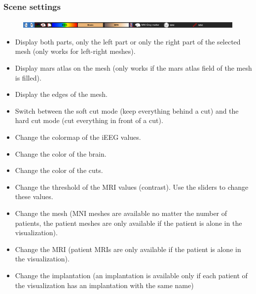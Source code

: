 \documentclass[a4paper]{article}
\begin{document}
\subsubsection{Scene settings}
\begin{figure}[H]
\begin{center}
\includegraphics[scale=0.45]{SceneSettings.png}
\end{center}
\end{figure}
\begin{itemize}
\item Display both parts, only the left part or only the right part of the selected mesh (only works for left-right meshes).
\item Display mars atlas on the mesh (only works if the mars atlas field of the mesh is filled).
\item Display the edges of the mesh.
\item Switch between the soft cut mode (keep everything behind a cut) and the hard cut mode (cut everything in front of a cut).
\item Change the colormap of the iEEG values.
\item Change the color of the brain.
\item Change the color of the cuts.
\item Change the threshold of the MRI values (contrast). Use the sliders to change these values.
\item Change the mesh (MNI meshes are available no matter the number of patients, the patient meshes are only available if the patient is alone in the visualization).
\item Change the MRI (patient MRIs are only available if the patient is alone in the visualization).
\item Change the implantation (an implantation is available only if each patient of the visualization has an implantation with the same name)
\end{itemize}
\end{document}
